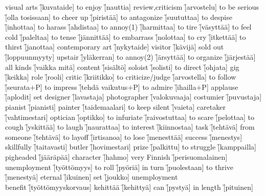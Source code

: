 \begin{questions}
\begin{multicols}{3}
    \question visual arts \f[kuvataide]
    \question to enjoy \f[nauttia]
    \question review,criticism \f[arvostelu]
    \question to be serious \f[olla tosissaan]
    \question to cheer up \f[piristää]
    \question to antagonize \f[suututtaa]
    \question to despise \f[inhottaa]
    \question to harass \f[ahdistaa]
    \question to annoy(1) \f[harmittaa]
    \question to tire \f[väsyttää]
    \question to feel cold \f[paleltaa]
    \question to tense \f[jännittää]
    \question to embarrass \f[nolottaa]
    \question to cry \f[itkettää]
    \question to thirst \f[janottaa]
    \question contemporary art \f[nykytaide]
    \question visitor \f[kävijä]
    \question sold out \f[loppuunmyyty]
    \question upstair \f[yläkerran]
    \question to annoy(2) \f[ärsyttää]
    \question to organize \f[järjestää]
    \question all kinds \f[vaikka mitä]
    \question content \f[sisältö]
    \question soloist \f[solisti]
    \question to direct \f[ohjata]
    \question gig \f[keikka]
    \question role \f[rooli]
    \question critic \f[kriitikko]
    \question to criticize/judge \f[arvostella]
    \question to follow \f[seurata$+$P]
    \question to impress \f[tehdä vaikutus$+$P]
    \question to admire \f[ihailla$+$P]
    \question applause \f[aplodit]
    \question set designer \f[lavastaja]
    \question photographer \f[valokuvaaja]
    \question costumier \f[puvustaja]
    \question pianist \f[pianisti]
    \question painter \f[taidemaalari]
    \question to keep silent \f[vaieta]
    \question caretaker \f[vahtimestari]
    \question optician \f[optikko]
    \question to infuriate \f[raivostuttaa]
    \question to scare \f[pelottaa]
    \question to cough \f[yskittää]
    \question to laugh \f[naurattaa]
    \question to interest \f[kiinnostaa]
    \question task \f[tehtävä]
    \question from someone \f[tehtävä]
    \question to layoff \f[irtisanoa]
    \question to lose \f[menesttää]
    \question success \f[menestys]
    \question skillfully \f[taitavasti]
    \question butler \f[hovimestari]
    \question prize \f[palkittu]
    \question to struggle \f[kamppailla]
    \question pigheaded \f[jääräpää]
    \question character \f[hahmo]
    \question very Finnish \f[perisuomalainen]
    \question unemployment \f[työttömyys]
    \question to roll \f[pyöriä]
    \question in turn \f[puolestaan]
    \question to thrive \f[menestyä]
    \question eternal \f[ikuinen]
    \question set \f[joukko]
    \question unemployment \\ benefit \f[työttömyyskorvaus]
    \question kehittää \f[kehittyä]
    \question can \f[pystyä]
    \question in length \f[pituinen]

\end{multicols}
\end{questions}
